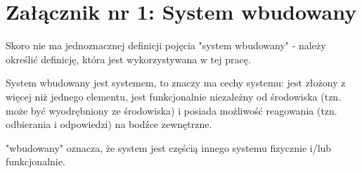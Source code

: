 \documentclass[../main]{subfiles}
\begin{document}
\section*{Załącznik nr 1: System wbudowany}\label{sec:zalacznik-1}

Skoro nie ma jednoznacznej definicji pojęcia "system wbudowany" - należy określić definicję, która jest
wykorzystywana w tej pracę.

System wbudowany jest systemem, to znaczy ma cechy systemu: jest złożony z więcej niż jednego elementu,
jest funkcjonalnie niezależny od środowiska (tzn. może być wyodrębniony ze środowiska) i posiada
możliwość  reagowania (tzn. odbierania  i odpowiedzi) na bodźce
zewnętrzne.

"wbudowany" oznacza, że system jest częścią innego systemu fizycznie i/lub funkcjonalnie.
\end{document}
